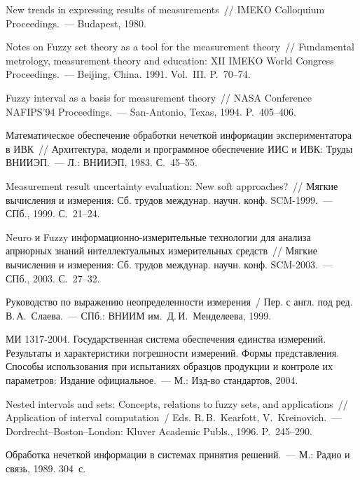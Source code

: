 \begin{multicols}{2}
{{\begin{thebibliography}{99}
New trends in expressing results of measurements~// IMEKO Colloquium 
Proceedings.~--- Budapest, 1980.

Notes on Fuzzy set theory as a tool for the measurement theory~// Fundamental 
metrology, measurement theory and education: XII IMEKO World Congress 
Proceedings.~--- Beijing, China. 1991. Vol.~III. P.~70--74.

Fuzzy interval as a basis for measurement theory~// NASA Conference NAFIPS'94 
Proceedings.~--- San-Antonio, Texas, 1994. P.~405--406.

Математическое обеспечение обработки нечеткой информации 
экспериментатора в ИВК~// Архитектура, модели и программное обеспечение 
ИИС и ИВК: Труды ВНИИЭП.~--- Л.: ВНИИЭП, 1983. С.~45--55.

Measurement result uncertainty evaluation: New soft approaches?~// Мягкие 
вычисления и измерения: Сб. трудов междунар. научн. конф. SCM-1999.~--- 
СПб., 1999. С.~21--24.

Neuro и Fuzzy информационно-из\-ме\-ри\-тель\-ные технологии для анализа 
априорных знаний интеллектуальных измерительных средств~// Мягкие 
вычисления и измерения: Сб. трудов междунар. научн. конф. SCM-2003.~--- 
СПб., 2003. С.~27--32.

Руководство по выражению неопределенности измерения~/ Пер. с англ. под 
ред. В.\,А.~Слаева.~--- СПб.: ВНИИМ им.\ Д.\,И.~Менделеева, 1999.

МИ 1317-2004. Государственная система обеспечения единства измерений. 
Результаты и характеристики погрешности измерений. Формы представления. 
Способы использования при испытаниях образцов продукции и контроле их 
параметров: Издание официальное.~--- М.: Изд-во стандартов, 2004.

Nested intervals and sets: Concepts, relations to fuzzy sets, and applications~// 
Application of interval computation~/ Eds. R.\,B.~Kearfott, V.~Kreinovich.~--- 
Dordrecht--Boston--London: Kluver Academic Publs., 1996. P.~245--290.

Обработка нечеткой информации в системах принятия решений.~--- М.: Радио 
и связь, 1989. 304~с.


\end{thebibliography}}}
\end{multicols}
